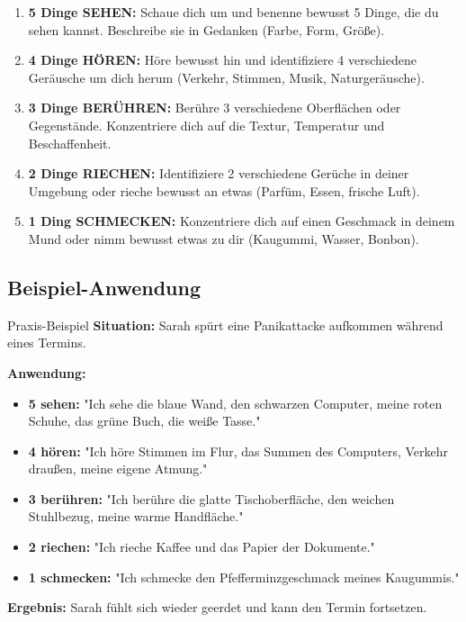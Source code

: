 \begin{enumerate}
\item \textbf{5 Dinge SEHEN:} Schaue dich um und benenne bewusst 5 Dinge, die du sehen kannst. Beschreibe sie in Gedanken (Farbe, Form, Größe).

\item \textbf{4 Dinge HÖREN:} Höre bewusst hin und identifiziere 4 verschiedene Geräusche um dich herum (Verkehr, Stimmen, Musik, Naturgeräusche).

\item \textbf{3 Dinge BERÜHREN:} Berühre 3 verschiedene Oberflächen oder Gegenstände. Konzentriere dich auf die Textur, Temperatur und Beschaffenheit.

\item \textbf{2 Dinge RIECHEN:} Identifiziere 2 verschiedene Gerüche in deiner Umgebung oder rieche bewusst an etwas (Parfüm, Essen, frische Luft).

\item \textbf{1 Ding SCHMECKEN:} Konzentriere dich auf einen Geschmack in deinem Mund oder nimm bewusst etwas zu dir (Kaugummi, Wasser, Bonbon).
\end{enumerate}

\subsection{Beispiel-Anwendung}

\begin{ctmmGrayBox}{Praxis-Beispiel}
\textbf{Situation:} Sarah spürt eine Panikattacke aufkommen während eines Termins.

\textbf{Anwendung:}
\begin{itemize}
\item \textbf{5 sehen:} "Ich sehe die blaue Wand, den schwarzen Computer, meine roten Schuhe, das grüne Buch, die weiße Tasse."
\item \textbf{4 hören:} "Ich höre Stimmen im Flur, das Summen des Computers, Verkehr draußen, meine eigene Atmung."
\item \textbf{3 berühren:} "Ich berühre die glatte Tischoberfläche, den weichen Stuhlbezug, meine warme Handfläche."
\item \textbf{2 riechen:} "Ich rieche Kaffee und das Papier der Dokumente."
\item \textbf{1 schmecken:} "Ich schmecke den Pfefferminzgeschmack meines Kaugummis."
\end{itemize}

\textbf{Ergebnis:} Sarah fühlt sich wieder geerdet und kann den Termin fortsetzen.
\end{ctmmGrayBox}

